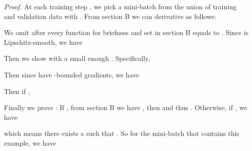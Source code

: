 \documentclass{article}
\begin{document}
\textit{Proof.} At each training step , we pick a mini-batch  from the union of training and validation data with . From section B we can derivative  as follows: 


We omit  after every function for briefness and set  in section B equals to . Since  is Lipschitz-smooth, we have 



Then we show  with a small enough . Specifically, 

Then since  have -bounded gradients, we have 


Then if , 


Finally we prove : 
If , from section B we have , then  and thus . Otherwise, if , we have 

which means there exists a  such that . So for the mini-batch  that contains this example, we have







{\small
	
}
\end{document}
